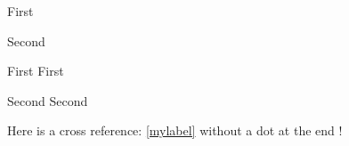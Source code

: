\documentclass[12pt,]{article}
\begin{document}
\begin{procedureflow}
	\item First
	\item Second
	\begin{procedureflow}
		\item First First
		\item Second Second\label{mylabel}
	\end{procedureflow}
\end{procedureflow}

Here is a cross reference: \ref{mylabel} without a dot at the end !
\end{document}

